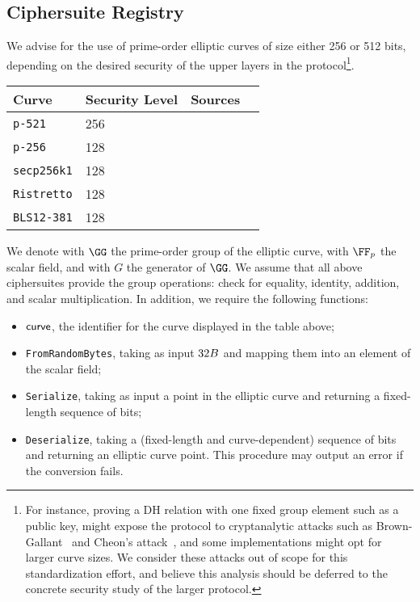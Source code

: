 \documentclass[11pt]{article}
\begin{document}

\subsection{Ciphersuite Registry}
 We advise for the use of prime-order elliptic curves of size either 256 or 512 bits, depending on the desired security of the upper layers in the protocol\footnote{For instance, proving a DH relation with one fixed group element such as a public key, might expose the protocol to cryptanalytic attacks such as Brown-Gallant~\cite{EPRINT:BroGal04} and Cheon’s attack~\cite{EC:Cheon06}, and some implementations might opt for larger curve sizes. We consider these attacks out of scope for this standardization effort, and believe this analysis should be deferred to the concrete security study of the larger protocol.}.

 \vspace{1em}
 \begin{center}
 \begin{tabular}{llcc}
  \hline
  Curve  & Security Level & Sources \\
  \hline
  \verb|p-521|     & 256& \cite{fips2} \\
  \verb|p-256|     & 128 & \cite{fips2}  \\
  \verb|secp256k1| & 128 & \cite{SECG} \\
  \verb|Ristretto| & 128 & \cite{cfrg-ristretto-decaf} \\
  \verb|BLS12-381| & 128 & \cite{bls12} \\
 \end{tabular}
\end{center}
We denote with $\GG$ the prime-order group of the elliptic curve, with $\FF_p$ the scalar field, and with $G$ the generator of $\GG$.
We assume that all above ciphersuites provide the group operations: check for equality, identity, addition, and scalar multiplication.
In addition, we require the following functions:

\begin{itemize}
  \item $\textsf{curve}$, the identifier for the curve displayed in the table above;
  \item \texttt{FromRandomBytes}, taking as input $32B$ and mapping them into an element of the scalar field;
  \item \texttt{Serialize}, taking as input a point in the elliptic curve and returning a fixed-length sequence of bits;
  \item \texttt{Deserialize}, taking a (fixed-length and curve-dependent) sequence of bits and returning an elliptic curve point. This procedure may output an error if the conversion fails.
\end{itemize}
\end{document}
